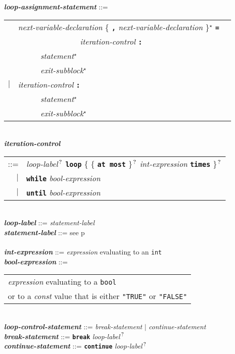 \documentclass[12pt]{article}
\newcommand{\TT}[1]{{\tt \bfseries #1}}
\newcommand{\STAR}{{\Large $^\star$}}
\newcommand{\QMARK}{{$^{\,\mbox{\footnotesize ?}}$}}
\newcommand{\ttkey}[1]{{\tt \bfseries #1}}
\newcommand{\emkey}[1]{{\em \bfseries #1}}
\newcommand{\pagref}[1]{p\pageref{#1}}
\newenvironment{indpar}[1][0.3in]%
	{\begin{list}{}%
		     {\setlength{\itemsep}{0in}%
		      \setlength{\topsep}{0in}%
		      \setlength{\parsep}{1ex}%
		      \setlength{\labelwidth}{#1}%
		      \setlength{\leftmargin}{#1}%
		      \addtolength{\leftmargin}{\labelsep}}%
	 \item}%
	{\end{list}}
\begin{document}
\begin{indpar}
\emkey{loop-assignment-statement} ::= \\
\hspace*{0.5in}
    \begin{tabular}[t]{@{}rll}
        & {\em next-variable-declaration}
                \{ \TT{,} {\em next-variable-declaration} \}\STAR{}
		\TT{=} \\
	& ~~~~~~~~~~~~~~~ {\em iteration-control} \TT{:} \\
        & ~~~~~ {\em statement}\STAR{} \\
        & ~~~~~ {\em exit-subblock}\STAR{} \\
    $|$ & {\em iteration-control} \TT{:} \\
        & ~~~~~ {\em statement}\STAR{} \\
        & ~~~~~ {\em exit-subblock}\STAR{} \\
    \end{tabular}
\\[0.5ex]
\emkey{iteration-control}\label{ITERATION-CONTROL}
    \begin{tabular}[t]{rl}
     ::= & {\em loop-label}\QMARK{} \ttkey{loop}
	   \{ \{ \ttkey{at most} \}\QMARK{}
	   {\em int-expression} \ttkey{times} \}\QMARK{} \\
     $|$ & \ttkey{while} {\em bool-expression} \\
     $|$ & \ttkey{until} {\em bool-expression} \\
     \end{tabular}
\\[0.5ex]
\emkey{loop-label} ::= {\em statement-label}
\\[0.5ex]
\emkey{statement-label} ::= see \pagref{STATEMENT-LABEL} \\
\\[0.5ex]
\emkey{int-expression} ::= {\em expression} evaluating to an {\tt int}
\\[0.5ex]
\emkey{bool-expression}\label{BOOL-EXPRESSION} ::=
    \begin{tabular}[t]{@{}l}
    {\em expression} evaluating to a {\tt bool} \\
    or to a {\em const} value that is either {\tt "TRUE"} or {\tt "FALSE"}
    \end{tabular}
\\[0.5ex]
\emkey{loop-control-statement}\label{LOOP-CONTROL-STATEMENT} ::=
    {\em break-statement} $|$ {\em continue-statement}
\\[0.5ex]
\emkey{break-statement}\label{BREAK-STATEMENT} ::=
    \ttkey{break} {\em loop-label}\QMARK{}
\\[0.5ex]
\emkey{continue-statement}\label{CONTINUE-STATEMENT} ::=
    \ttkey{continue} {\em loop-label}\QMARK{}
\end{indpar}
\end{document}
